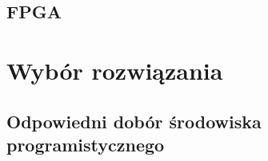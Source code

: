 \subsection{FPGA}
\label{FPGA}

\section{Wybór rozwiązania}
\label{sec:wybór}

\subsection{Odpowiedni dobór środowiska programistycznego}
\label{sec:IDE}
